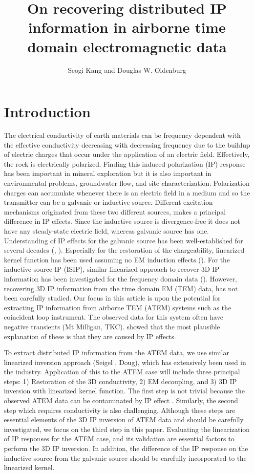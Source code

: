 \documentclass[a4paper, 11pt]{article}
\author{Seogi Kang and Douglas W. Oldenburg}
\title{On recovering distributed IP information in airborne time domain electromagnetic data}
\begin{document}
\maketitle
\tableofcontents
\clearpage

\section{Introduction}

The electrical conductivity of earth materials can be frequency dependent with the effective conductivity decreasing with decreasing frequency due to the buildup of electric charges that occur under the application of an electric field.
Effectively, the rock is electrically polarized. Finding this induced polarization (IP) response has been important in mineral exploration but it is also important in environmental problems, groundwater flow, and site characterization. 
Polarization charges can accumulate whenever there is an electric field in a medium and so the transmitter can be a galvanic or inductive source. 
Different excitation mechanisms originated from these two different sources, makes a principal difference in IP effects. 
Since the inductive source is divergence-free it does not have any steady-state electric field, whereas galvanic source has one. 
Understanding of IP effects for the galvanic source has been well-established for several decades (\cite{seigel1959}, \cite{seigel1974}). Especially for the restoration of the chargeability, linearized kernel function has been used assuming no EM induction effects (\cite{doug1994}). For the inductive source IP (ISIP), similar linearized approach to recover 3D IP information has been investigated for the frequency domain data (\cite{Marchant2012b}). However, recovering 3D IP information from the time domain EM (TEM) data, has not been carefully studied. 
Our focus in this article is upon the potential for extracting IP information from airborne TEM (ATEM) systems such as the coincident loop instrument. The observed data for this system often have negative transients (Mt Milligan, TKC). \cite{Weidelt1982} showed that the most plausible explanation of these is that they are caused by IP effects. 

To extract distributed IP information from the ATEM data, we use similar linearized inversion approach (Seigel , Doug), which has extensively been used in the industry. Application of this to the ATEM case will include three principal steps: 1) Restoration of the 3D conductivity, 2) EM decoupling, and 3) 3D IP inversion with linearized kernel function. 
The first step is not trivial because the observed ATEM data can be contaminated by IP effect . 
Similarly, the second step which requires conductivity is also challenging. Although these steps are essential elements of the 3D IP inversion of ATEM data and should be carefully investigated, we focus on the third step in this paper. 
Evaluating the linearization of IP responses for the ATEM case, and its validation are essential factors to perform the 3D IP inversion. 
In addition, the difference of the IP response on the inductive source from the galvanic source should be carefully incorporated to the linearized kernel.  
\end{document}
